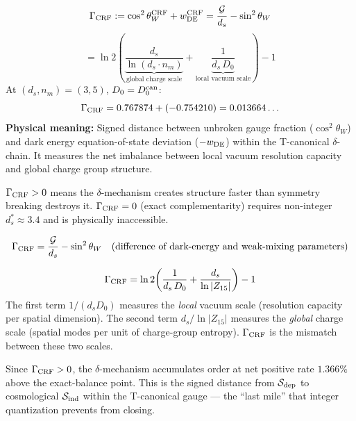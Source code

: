 \documentclass[12pt, a4paper]{article}
\begin{document}
\begin{formalbox}[title={DEF-ZC24-GAMMA-01: The CRF
  Cosmological-Gauge Residual}]
\[
  \Gamma_{\rm CRF}
  := \cos^2\theta_W^{\rm CRF} + w_{\rm DE}^{\rm CRF}
  = \frac{\mathcal{G}}{d_s} - \sin^2\theta_W
\]
\[
  = \ln 2\!\left(
      \underbrace{\frac{d_s}{\ln(d_s\cdot n_m)}}_{\text{global charge scale}}
      + \underbrace{\frac{1}{d_s\,D_0}}_{\text{local vacuum scale}}
    \right) - 1
\]
At $(d_s,n_m)=(3,5)$, $D_0 = D_0^{\rm can}$:
\[
  \Gamma_{\rm CRF} = 0.767874 + (-0.754210) = 0.013664\ldots
\]
\textbf{Physical meaning:}
Signed distance between unbroken gauge fraction
($\cos^2\theta_W$) and dark energy equation-of-state
deviation ($-w_{\rm DE}$) within the T-canonical $\delta$-chain.
It measures the net imbalance between local vacuum resolution
capacity and global charge group structure.

\medskip
$\Gamma_{\rm CRF} > 0$ means the $\delta$-mechanism creates
structure faster than symmetry breaking destroys it.
$\Gamma_{\rm CRF} = 0$ (exact complementarity) requires
non-integer $d_s^* \approx 3.4$ and is physically inaccessible.
\end{formalbox}

\begin{derivedbox}[title={FIND-ZC24-GAMMA-01: Clean Form}]
\[
  \Gamma_{\rm CRF} = \frac{\mathcal{G}}{d_s} - \sin^2\theta_W
  \quad \text{(difference of dark-energy and weak-mixing parameters)}
\]
\end{derivedbox}

\begin{derivedbox}[title={FIND-ZC24-GAMMA-02: Two-Scale
  Interpretation}]
\[
  \Gamma_{\rm CRF}
  = \ln 2\!\left(
      \frac{1}{d_s\,D_0} + \frac{d_s}{\ln|Z_{15}|}
    \right) - 1
\]
The first term $1/(d_s D_0)$ measures the \emph{local} vacuum
scale (resolution capacity per spatial dimension). The second
term $d_s/\ln|Z_{15}|$ measures the \emph{global} charge scale
(spatial modes per unit of charge-group entropy).
$\Gamma_{\rm CRF}$ is the mismatch between these two scales.
\end{derivedbox}

\begin{derivedbox}[title={FIND-ZC24-GAMMA-03: Net Order
  Accumulation Rate}]
Since $\Gamma_{\rm CRF} > 0$, the $\delta$-mechanism accumulates
order at net positive rate $1.366\%$ above the exact-balance
point. This is the signed distance from $\mathcal{S}_{\rm dep}$
to cosmological $\mathcal{S}_{\rm ind}$ within the T-canonical
gauge --- the ``last mile'' that integer quantization prevents
from closing.
\end{derivedbox}
\end{document}
